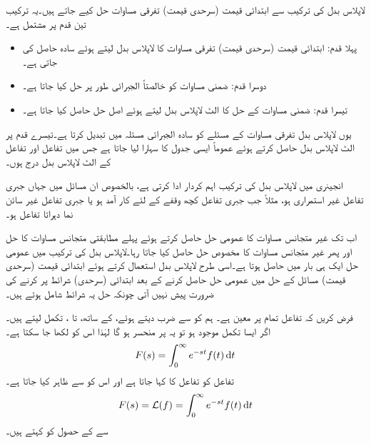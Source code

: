 لاپلاس بدل کی ترکیب سے ابتدائی قیمت (سرحدی قیمت) تفرقی مساوات حل کیے جاتے ہیں۔یہ ترکیب تین قدم پر مشتمل ہے۔
\begin{itemize}
\item
پہلا قدم: ابتدائی قیمت (سرحدی قیمت) تفرقی مساوات کا لاپلاس بدل لیتے ہوئے سادہ  حاصل کی جاتی ہے۔
\item
دوسرا قدم:  ضمنی مساوات کو خالصتاً الجبرائی طور پر حل کیا جاتا ہے۔
\item
تیسرا قدم: ضمنی مساوات کے حل کا الٹ لاپلاس بدل لیتے ہوئے اصل حل حاصل کیا جاتا ہے۔
\end{itemize}  

یوں لاپلاس بدل تفرقی مساوات کے مسئلے کو سادہ الجبرائی مسئلہ میں تبدیل کرتا ہے۔تیسرے قدم پر الٹ لاپلاس بدل حاصل کرتے ہوئے عموماً ایسی جدول کا سہارا لیا جاتا ہے جس  میں تفاعل اور تفاعل کے الٹ لاپلاس بدل درج ہوں۔ 

انجینری میں لاپلاس بدل کی ترکیب اہم کردار ادا کرتی ہے، بالخصوص ان مسائل میں جہاں جبری تفاعل غیر استمراری ہو، مثلاً جب جبری تفاعل کچھ وقفے کے لئے کار آمد ہو یا جبری تفاعل غیر سائن نما دہراتا تفاعل ہو۔

اب تک غیر متجانس مساوات کا عمومی حل حاصل کرتے ہوئے پہلے مطابقتی متجانس مساوات کا حل اور پھر غیر متجانس مساوات کا مخصوص حل حاصل کیا جاتا رہا۔لاپلاس بدل کی ترکیب میں عمومی حل ایک ہی بار میں حاصل ہوتا ہے۔اسی طرح لاپلاس بدل استعمال کرتے ہوئے ابتدائی قیمت (سرحدی قیمت) مسائل کے حل میں عمومی حل حاصل کرنے کے بعد ابتدائی (سرحدی) شرائط پر کرنے کی ضرورت پیش نہیں آتی چونکہ حل یہ شرائط شامل ہوتے ہیں۔

فرض کریں کہ تفاعل  تمام  پر معین ہے۔ ہم  کو  سے ضرب دیتے ہوئے،   کے ساتھ،  تا ، تکمل لیتے ہیں۔ اگر ایسا تکمل موجود ہو تو یہ  پر منحسر ہو گا لہٰذا اس کو  لکھا جا سکتا ہے۔
\begin{align}
F(s)=\int_{0}^{\infty}e^{-st}f(t)\dif t
\end{align} 
تفاعل  کو تفاعل  کا  کہا جاتا ہے اور اس کو
  سے ظاہر کیا جاتا ہے۔
\begin{align}\label{مساوات_لاپلاس_بدل_الف}
F(s)=\Laplace(f)=\int_{0}^{\infty} e^{-st} f(t)\dif t
\end{align}
 سے  کے حصول کو  کہتے ہیں۔

